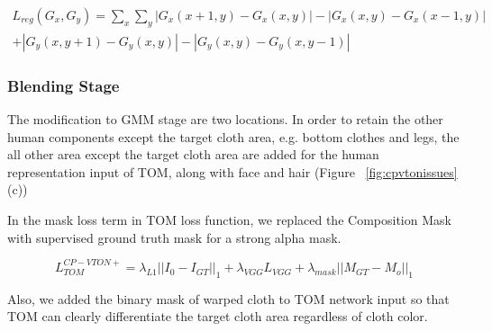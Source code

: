 \begin{equation}\label{eq:gridloss}
\begin{aligned}
 L_{reg} (G_x, G_y) = \sum_x \sum_y | G_x(x+1, y) - G_x(x, y) | - | G_x(x, y) - G_x(x-1, y) | \\
 + | G_y(x, y+1) - G_y(x, y) | - | G_y(x, y) - G_y(x, y-1) |
\end{aligned}
\end{equation}



\subsubsection{Blending Stage}

The modification to GMM stage are two locations.
In order to retain the other human components except the target cloth area, e.g. bottom clothes and legs, the all other area except the target cloth area are added for the human representation input of TOM, along with face and hair (Figure ~\ref{fig:cpvtonissues} (c))

In the mask loss term in TOM loss function, we replaced the Composition Mask with supervised ground truth mask for a strong alpha mask.

\begin{equation}
 L_{TOM}^{CP-VTON+} = \lambda_{L1} || I_0-I_{GT}||_1+  \lambda_{VGG} L_{VGG} + \lambda_{mask} ||M_{GT}-M_o||_1       
\end{equation}

Also, we added the binary mask of warped cloth to TOM network input so that TOM can clearly differentiate the target cloth area regardless of cloth color.  



